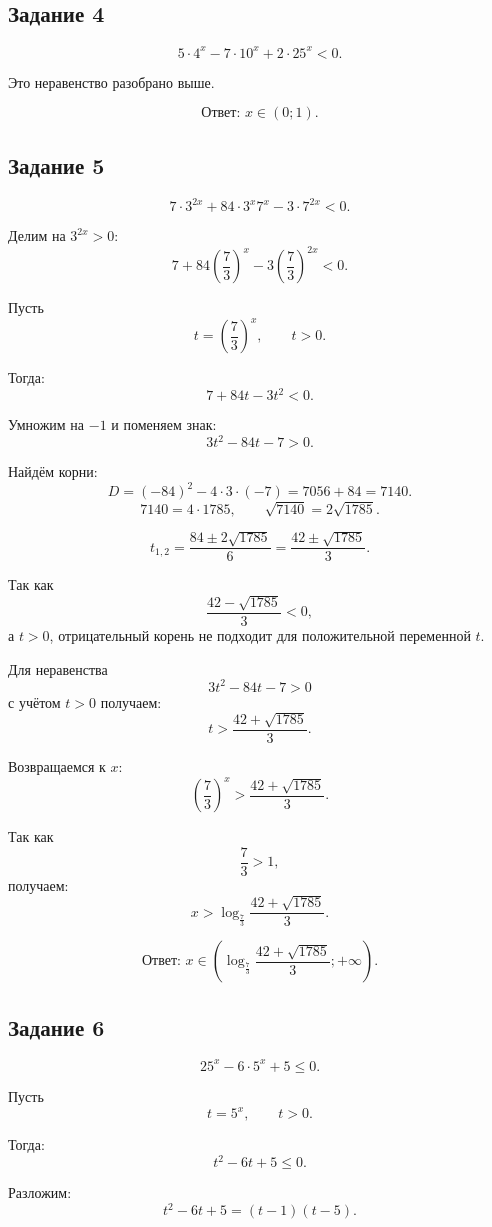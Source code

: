 \documentclass[a4paper,12pt]{article}
\newcommand{\answer}[1]{\textbf{Ответ: }#1}
\begin{document}
\subsection*{Задание 4}

\[
5\cdot4^x-7\cdot10^x+2\cdot25^x<0.
\]

Это неравенство разобрано выше.

\[
\answer{\displaystyle x\in(0;1).}
\]

\subsection*{Задание 5}

\[
7\cdot3^{2x}+84\cdot3^x7^x-3\cdot7^{2x}<0.
\]

Делим на \(3^{2x}>0\):
\[
7+84\left(\frac73\right)^x-3\left(\frac73\right)^{2x}<0.
\]

Пусть
\[
t=\left(\frac73\right)^x,\qquad t>0.
\]

Тогда:
\[
7+84t-3t^2<0.
\]

Умножим на \(-1\) и поменяем знак:
\[
3t^2-84t-7>0.
\]

Найдём корни:
\[
D=(-84)^2-4\cdot3\cdot(-7)=7056+84=7140.
\]
\[
7140=4\cdot1785,
\qquad
\sqrt{7140}=2\sqrt{1785}.
\]

\[
t_{1,2}=\frac{84\pm2\sqrt{1785}}{6}
=
\frac{42\pm\sqrt{1785}}{3}.
\]

Так как
\[
\frac{42-\sqrt{1785}}{3}<0,
\]
а \(t>0\), отрицательный корень не подходит для положительной переменной \(t\).

Для неравенства
\[
3t^2-84t-7>0
\]
с учётом \(t>0\) получаем:
\[
t>\frac{42+\sqrt{1785}}{3}.
\]

Возвращаемся к \(x\):
\[
\left(\frac73\right)^x>\frac{42+\sqrt{1785}}{3}.
\]

Так как
\[
\frac73>1,
\]
получаем:
\[
x>\log_{\frac73}\frac{42+\sqrt{1785}}{3}.
\]

\[
\answer{\displaystyle x\in\left(\log_{\frac73}\frac{42+\sqrt{1785}}{3};+\infty\right).}
\]

\subsection*{Задание 6}

\[
25^x-6\cdot5^x+5\le0.
\]

Пусть
\[
t=5^x,\qquad t>0.
\]

Тогда:
\[
t^2-6t+5\le0.
\]

Разложим:
\[
t^2-6t+5=(t-1)(t-5).
\]
\end{document}
